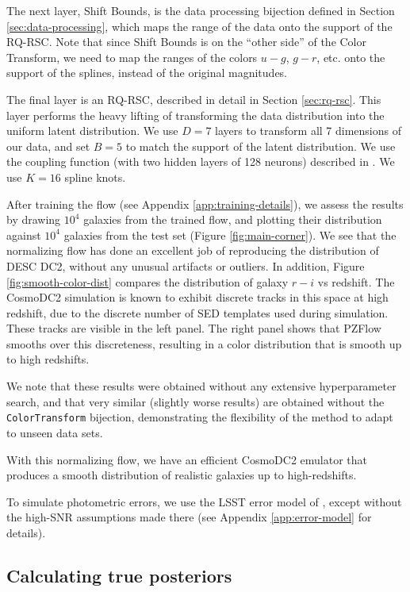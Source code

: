 \documentclass[twocolumn]{aastex631}
\begin{document}
The next layer, Shift Bounds, is the data processing bijection defined in Section \ref{sec:data-processing}, which maps the range of the data onto the support of the RQ-RSC.
Note that since Shift Bounds is on the ``other side'' of the Color Transform, we need to map the ranges of the colors $u-g$, $g-r$, etc. onto the support of the splines, instead of the original magnitudes.

The final layer is an RQ-RSC, described in detail in Section \ref{sec:rq-rsc}.
This layer performs the heavy lifting of transforming the data distribution into the uniform latent distribution.
We use $D=7$ layers to transform all 7 dimensions of our data, and set $B=5$ to match the support of the latent distribution.
We use the coupling function (with two hidden layers of 128 neurons) described in \citet{durkan2019}.
We use $K=16$ spline knots.

After training the flow (see Appendix \ref{app:training-details}), we assess the results by drawing $10^4$ galaxies from the trained flow, and plotting their distribution against  $10^4$ galaxies from the test set (Figure \ref{fig:main-corner}).
We see that the normalizing flow has done an excellent job of reproducing the distribution of DESC DC2, without any unusual artifacts or outliers.
In addition, Figure \ref{fig:smooth-color-dist} compares the distribution of galaxy $r-i$ vs redshift.
The CosmoDC2 simulation is known to exhibit discrete tracks in this space at high redshift, due to the discrete number of SED templates used during simulation.
These tracks are visible in the left panel.
The right panel shows that PZFlow smooths over this discreteness, resulting in a color distribution that is smooth up to high redshifts.

We note that these results were obtained without any extensive hyperparameter search, and that very similar (slightly worse results) are obtained without the \texttt{ColorTransform} bijection, demonstrating the flexibility of the method to adapt to unseen data sets.

With this normalizing flow, we have an efficient CosmoDC2 emulator that produces a smooth distribution of realistic galaxies up to high-redshifts.

To simulate photometric errors, we use the LSST error model of \citet{ivezic2019}, except without the high-SNR assumptions made there (see Appendix \ref{app:error-model} for details).

\subsection{Calculating true posteriors}
\label{sec:true-posteriors}
\end{document}
